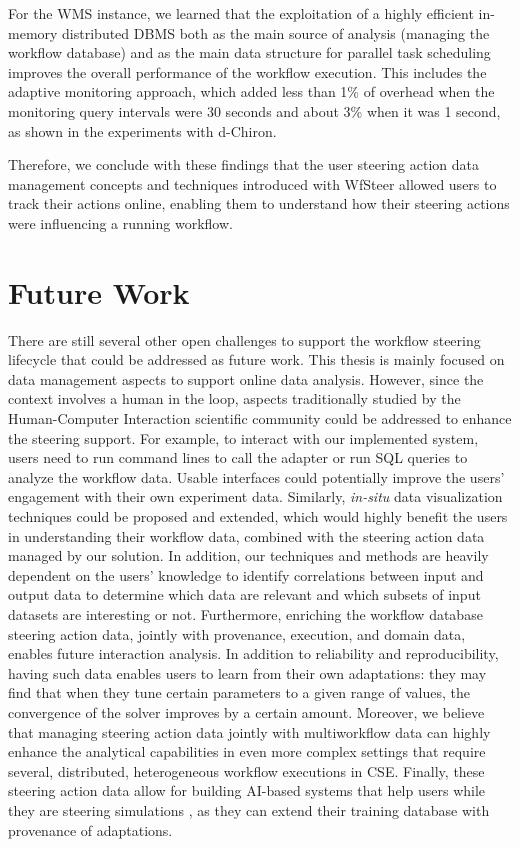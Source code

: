 For the WMS instance, we learned that the exploitation of a highly efficient
in-memory distributed DBMS both as the main source of analysis (managing
the workflow database) and as the main data structure for parallel
task scheduling improves the overall performance of the workflow execution.
This includes the adaptive monitoring approach, which added less than 1\% of overhead when the monitoring query intervals were 30 seconds and about 3\% when it was 1 second, as shown in the experiments with d-Chiron.

Therefore, we conclude with these findings that
the user steering action data management concepts and techniques introduced with WfSteer allowed users to track their actions online, enabling them to understand how their steering actions were influencing a running workflow. 

\section{Future Work}
\label{future}

There are still several other open challenges to support the workflow steering lifecycle that could be addressed as future work.
This thesis is mainly focused on data management aspects to support online data analysis.
However, since the context involves a human in the loop, aspects traditionally studied by
the Human-Computer Interaction scientific community could be addressed to enhance
the steering support. For example, to interact with our implemented system,
users need to run command lines to call the adapter or run SQL queries to analyze
the workflow data. Usable interfaces could potentially improve the users' engagement
with their own experiment data. Similarly, \textit{in-situ} data visualization techniques
\cite{Bauer2016In} could be proposed and extended, which would highly benefit
the users in understanding their workflow data, combined with the steering action data
managed by our solution.
In addition, our techniques and methods are heavily dependent on the users’ knowledge
to identify correlations between input and output data to determine which data are relevant
and which subsets of input datasets are interesting or not.
Furthermore, enriching the workflow database steering action data,
jointly with provenance, execution, and domain data, enables future interaction
analysis. In addition to reliability and reproducibility, having such
data enables users to learn from their own adaptations: they may find
that when they tune certain parameters to a given range of values, the
convergence of the solver improves by a certain amount.
Moreover, we believe that managing steering action data jointly with multiworkflow data \cite{souza_efficient_2019} can highly enhance the analytical capabilities in even more complex settings that require several, distributed, heterogeneous workflow executions in CSE.
Finally, these
steering action data allow for building AI-based systems that help users
while they are steering simulations \cite{Silva2018JobPruner:},
as they can extend their training database with provenance of
adaptations.
